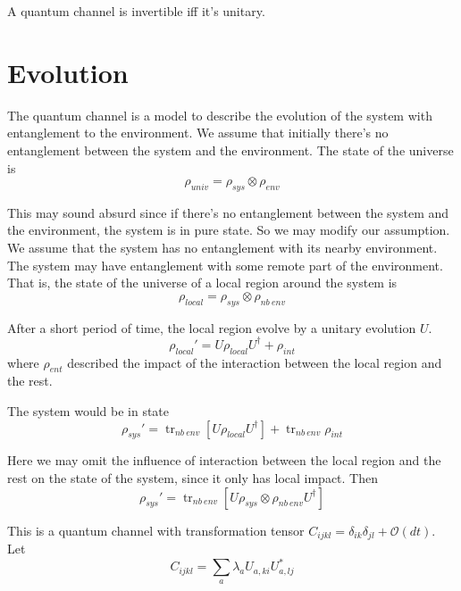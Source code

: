 \documentclass[12pt]{book}
\DeclareMathOperator{\tr}{tr}
\begin{document}
\begin{corollary}
	A quantum channel is invertible iff it's unitary.
\end{corollary}

\section{Evolution}

The quantum channel is a model to describe the evolution of the system with entanglement to the environment. We assume that initially there's no entanglement between the system and the environment. The state of the universe is
\begin{equation}
	\rho_{univ}=\rho_{sys}\otimes \rho_{env}
\end{equation}

This may sound absurd since if there's no entanglement between the system and the environment, the system is in pure state. So we may modify our assumption. We assume that the system has no entanglement with its nearby environment. The system may have entanglement with some remote part of the environment. That is, the state of the universe of a local region around the system is
\begin{equation}
	\rho_{local}=\rho_{sys}\otimes \rho_{nb\ env}
\end{equation}

After a short period of time, the local region evolve by a unitary evolution $U$.
\begin{equation}
	\rho_{local}'=U\rho_{local}U^\dagger+\rho_{int}
\end{equation}
where $\rho_{ent}$ described the impact of the interaction between the local region and the rest.

The system would be in state
\begin{equation}
	\rho_{sys}'=\tr_{nb\ env}[U\rho_{local}U^\dagger]+\tr_{nb\ env}\rho_{int}
\end{equation}

Here we may omit the influence of interaction between the local region and the rest on the state of the system, since it only has local impact. Then
\begin{equation}
	\rho_{sys}'=\tr_{nb\ env}[U\rho_{sys}\otimes \rho_{nb\ env}U^\dagger]
\end{equation}


This is a quantum channel with transformation tensor $C_{ijkl}=\delta_{ik}\delta_{jl}+\mathcal O(dt)$. Let
\begin{equation}
	C_{ijkl}=\sum_a \lambda_aU_{a,ki}U^*_{a,lj}
\end{equation}
\end{document}
